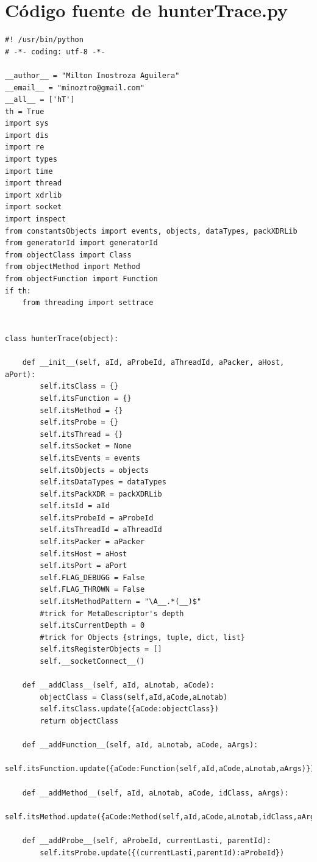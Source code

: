 \documentclass[12pt,legalpaper]{report}
\begin{document}
	\section{Código fuente de hunterTrace.py}
\begin{singlespace}
\begin{lstlisting}[style=Python]
#! /usr/bin/python
# -*- coding: utf-8 -*-

__author__ = "Milton Inostroza Aguilera"
__email__ = "minoztro@gmail.com"
__all__ = ['hT']
th = True
import sys
import dis
import re
import types
import time
import thread
import xdrlib
import socket
import inspect
from constantsObjects import events, objects, dataTypes, packXDRLib
from generatorId import generatorId
from objectClass import Class
from objectMethod import Method
from objectFunction import Function
if th:
    from threading import settrace   


class hunterTrace(object):

    def __init__(self, aId, aProbeId, aThreadId, aPacker, aHost, aPort):
        self.itsClass = {}
        self.itsFunction = {}
        self.itsMethod = {}
        self.itsProbe = {}
        self.itsThread = {}
        self.itsSocket = None
        self.itsEvents = events
        self.itsObjects = objects
        self.itsDataTypes = dataTypes
        self.itsPackXDR = packXDRLib
        self.itsId = aId
        self.itsProbeId = aProbeId
        self.itsThreadId = aThreadId
        self.itsPacker = aPacker
        self.itsHost = aHost
        self.itsPort = aPort
        self.FLAG_DEBUGG = False
        self.FLAG_THROWN = False
        self.itsMethodPattern = "\A__.*(__)$"
        #trick for MetaDescriptor's depth
        self.itsCurrentDepth = 0
        #trick for Objects {strings, tuple, dict, list}
        self.itsRegisterObjects = []
        self.__socketConnect__()

    def __addClass__(self, aId, aLnotab, aCode):
        objectClass = Class(self,aId,aCode,aLnotab)
        self.itsClass.update({aCode:objectClass})
        return objectClass

    def __addFunction__(self, aId, aLnotab, aCode, aArgs):
        self.itsFunction.update({aCode:Function(self,aId,aCode,aLnotab,aArgs)})

    def __addMethod__(self, aId, aLnotab, aCode, idClass, aArgs):
        self.itsMethod.update({aCode:Method(self,aId,aCode,aLnotab,idClass,aArgs)})

    def __addProbe__(self, aProbeId, currentLasti, parentId):
        self.itsProbe.update({(currentLasti,parentId):aProbeId})


\end{lstlisting}
\end{singlespace}
\end{document}
